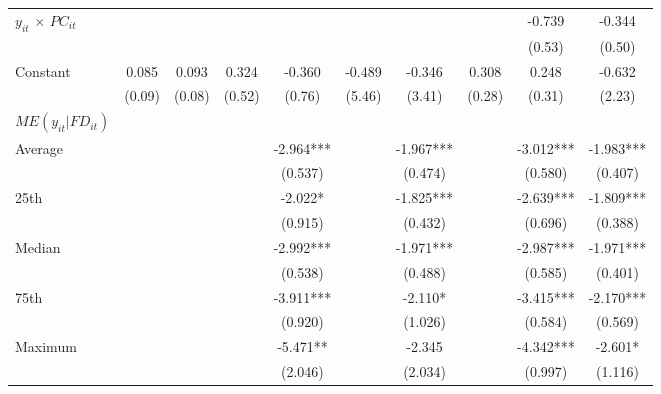 \documentclass[12pt, a4paper]{article}
\begin{document}
\begin{table}[htbp]
\begin{threeparttable}
{\begin{tabular}{l*{9}{c}}
				$y_{it}$ $\times$ $PC_{it}$ &                     &                     &                     &                     &                     &                     &                     &      -0.739         &      -0.344         \\
				&                     &                     &                     &                     &                     &                     &                     &      (0.53)         &      (0.50)         \\
				Constant            &       0.085         &       0.093         &       0.324         &      -0.360         &      -0.489         &      -0.346         &       0.308         &       0.248         &      -0.632         \\
				&      (0.09)         &      (0.08)         &      (0.52)         &      (0.76)         &      (5.46)         &      (3.41)         &      (0.28)         &      (0.31)         &      (2.23)         \\
				\hline
				$ME(y_{it}|FD_{it})$ \\
				Average&&&&	-2.964***&&	-1.967***&&	-3.012***	&	-1.983***\\
				&&&&(0.537)   &&		(0.474)   &&		(0.580)  & 		(0.407)  \\ 
				
				25th&&&&	-2.022* && 		-1.825***	&&	-2.639***	&	-1.809***\\
				&&&&(0.915)   &&		(0.432)   	&&	(0.696)   &		(0.388)  \\ 
				
				Median&&&&	-2.992***	&&	-1.971***&&		-2.987***&	-1.971***\\
				&&&&(0.538)   &&		(0.488)  && 		(0.585)   &		(0.401)   \\
				
				75th&&&&	-3.911***	&&	-2.110*  &&		-3.415***	&	-2.170***\\
				&&&&(0.920)   	&&	(1.026)   &&		(0.584)   	&	(0.569) \\  
				
				Maximum	&&&& -5.471** 	&&	-2.345  && 		-4.342***	&	-2.601* \\ 
				&&&&(2.046)   	&&	(2.034)   &&		(0.997)  &		(1.116)   \\
				

\end{tabular}}
\end{threeparttable}
\end{table}
\end{document}
